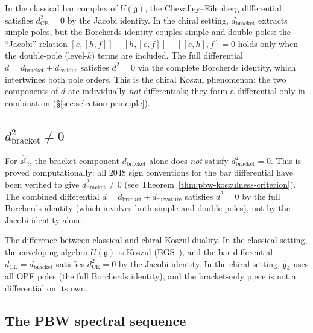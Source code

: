 \begin{remark}[Why \texorpdfstring{$d_{\mathrm{bracket}}^2 \neq 0$}{d\_bracket\textasciicircum 2 != 0}]
\label{rem:frame-why-dbracket-fails}
In the classical bar complex of $U(\mathfrak{g})$, the
Chevalley--Eilenberg differential satisfies
$d_{\mathrm{CE}}^2 = 0$ by the Jacobi identity. In the chiral
setting, $d_{\mathrm{bracket}}$ extracts simple poles, but the
Borcherds identity couples simple and double poles:
the ``Jacobi'' relation $[e, [h, f]] - [h, [e, f]] - [[e,h], f] = 0$
holds only when the double-pole (level-$k$) terms are included.
The full differential $d = d_{\mathrm{bracket}} + d_{\mathrm{residue}}$
satisfies $d^2 = 0$ via the complete Borcherds identity, which
intertwines both pole orders. This is the chiral Koszul phenomenon:
the two components of $d$ are individually \emph{not} differentials;
they form a differential only in combination
(\S\ref{sec:selection-principle}).
\end{remark}

\subsection{\texorpdfstring{$d_{\mathrm{bracket}}^2 \neq 0$}{d bracket squared is not zero}}

For $\widehat{\mathfrak{sl}}_2$, the bracket component
$d_{\mathrm{bracket}}$ alone does \emph{not} satisfy
$d_{\mathrm{bracket}}^2 = 0$. This is proved computationally:
all $2048$ sign conventions for the bar differential have been
verified to give $d_{\mathrm{bracket}}^2 \neq 0$
(see Theorem~\ref{thm:pbw-koszulness-criterion}).
The combined differential $d = d_{\mathrm{bracket}}
+ d_{\mathrm{curvature}}$ satisfies $d^2 = 0$ by the full
Borcherds identity (which involves both simple and double poles),
not by the Jacobi identity alone.

The difference between classical and chiral
Koszul duality. In the classical setting, the enveloping algebra
$U(\mathfrak{g})$ is Koszul (BGS~\cite{BGS96}), and the bar
differential $d_{\mathrm{CE}} = d_{\mathrm{bracket}}$ satisfies
$d_{\mathrm{CE}}^2 = 0$ by the Jacobi identity. In the chiral
setting, $\widehat{\mathfrak{g}}_k$ uses all OPE poles (the full
Borcherds identity), and the bracket-only piece is not a
differential on its own.

\subsection{The PBW spectral sequence}

